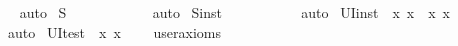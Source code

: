 \begin{isabellebody}
\isadelimproof
\ %
\endisadelimproof
%
\isatagproof
{}\isamarkupfalse%
\ auto%
\endisatagproof
{\isafoldproof}%
%
\isadelimproof
%
\endisadelimproof
\isanewline
{}\isamarkupfalse%
\ S{}\ {\isacharcolon}\ \ \ \ \ \ {\isachardoublequoteopen}{\isasymalpha}\ \isactrlbold {\isacharequal}\ {\isasymalpha}{\isachardoublequoteclose}%
\isadelimproof
\ %
\endisadelimproof
%
\isatagproof
{}\isamarkupfalse%
\ auto%
\endisatagproof
{\isafoldproof}%
%
\isadelimproof
%
\endisadelimproof
\isanewline
{}\isamarkupfalse%
\ S{}{\isacharunderscore}inst\ {\isacharcolon}\ {\isachardoublequoteopen}{\isacharparenleft}{\isasymPhi}{\isacharparenleft}{\isasymalpha}{\isacharparenright}\ \isactrlbold {\isasymand}\ {\isacharparenleft}{\isasymalpha}\ \isactrlbold {\isacharequal}\ {\isasymbeta}{\isacharparenright}{\isacharparenright}\ \isactrlbold {\isasymrightarrow}\ {\isasymPhi}{\isacharparenleft}{\isasymbeta}{\isacharparenright}{\isachardoublequoteclose}%
\isadelimproof
\ %
\endisadelimproof
%
\isatagproof
{}\isamarkupfalse%
\ auto%
\endisatagproof
{\isafoldproof}%
%
\isadelimproof
%
\endisadelimproof
\isanewline
{}\isamarkupfalse%
\ UI{\isacharunderscore}inst\ {\isacharcolon}\ {\isachardoublequoteopen}{\isacharparenleft}{\isacharparenleft}\isactrlbold {\isasymforall}x{\isachardot}\ {\isasymPhi}{\isacharparenleft}x{\isacharparenright}{\isacharparenright}\ \isactrlbold {\isasymand}\ {\isacharparenleft}\isactrlbold {\isasymexists}x{\isachardot}\ x\ \isactrlbold {\isacharequal}\ {\isasymalpha}{\isacharparenright}{\isacharparenright}\ \isactrlbold {\isasymrightarrow}\ {\isasymPhi}{\isacharparenleft}{\isasymalpha}{\isacharparenright}{\isachardoublequoteclose}%
\isadelimproof
\ %
\endisadelimproof
%
\isatagproof
{}\isamarkupfalse%
\ auto%
\endisatagproof
{\isafoldproof}%
%
\isadelimproof
%
\endisadelimproof
\isanewline
{}\isamarkupfalse%
\ UI{\isacharunderscore}test\ {\isacharcolon}\ {\isachardoublequoteopen}{\isacharparenleft}\isactrlbold {\isasymforall}x{\isachardot}\ {\isasymPhi}{\isacharparenleft}x{\isacharparenright}{\isacharparenright}\ \isactrlbold {\isasymrightarrow}\ {\isasymPhi}{\isacharparenleft}{\isasymalpha}{\isacharparenright}{\isachardoublequoteclose}\ \isamarkupfalse%
\ {\isacharbrackleft}user{\isacharunderscore}axioms{\isacharbrackright}%
\isadelimproof
\ %
\endisadelimproof
%
\isatagproof
{}\isamarkupfalse%
\ %
%
\endisatagproof
{\isafoldproof}%
%
\isadelimproof
%
\endisadelimproof

\end{isabellebody}
